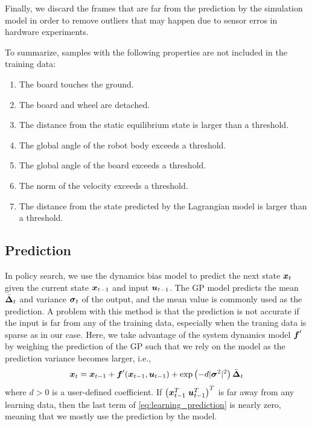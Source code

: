Finally, we discard the frames that are far from the prediction by the
simulation model in order to remove outliers that may happen due to
sensor erros in hardware experiments.

To summarize, samples with the following properties are not included in
the training data:
\begin{enumerate}
\item The board touches the ground.
\item The board and wheel are detached.
\item The distance from the static equilibrium state is larger than a
	  threshold.
\item The global angle of the robot body exceeds a threshold.
\item The global angle of the board exceeds a threshold.
\item The norm of the velocity exceeds a threshold.
\item The distance from the state predicted by the Lagrangian model is
	  larger than a threshold.
\end{enumerate}


\subsection{Prediction}

In policy search, we use the dynamics bias model to predict the next
state $\mbox{\boldmath \(x\)}_t$ given the current state $\mbox{\boldmath \(x\)}_{t-1}$ and input
$\mbox{\boldmath \(u\)}_{t-1}$.
The GP model predicts the mean
$\bar{\mbox{\boldmath \(\Delta\)}}_t$ and variance $\mbox{\boldmath \(\sigma\)}_t$ of the
output, and the mean value is commonly used as the prediction.
A problem with this method is that the prediction is not accurate if the
input is far from any of the training data, especially when the traning
data is sparse as in our case.
Here, we take advantage of the system dynamics model $\mbox{\boldmath \(f\)}'$ by
weighing the prediction of the GP such that we rely on the model as the
prediction variance becomes larger, i.e.,
\begin{equation}
\mbox{\boldmath \(x\)}_t = \mbox{\boldmath \(x\)}_{t-1} + \mbox{\boldmath \(f\)}'(\mbox{\boldmath \(x\)}_{t-1}, \mbox{\boldmath \(u\)}_{t-1}) +
 \exp\left( -d |\mbox{\boldmath \(\sigma\)}^2|^2\right) \bar{\mbox{\boldmath \(\Delta\)}}_t
\label{eq:learning_prediction}
\end{equation}
where $d>0$ is a user-defined coefficient.
If $\left(\mbox{\boldmath \(x\)}_{t-1}^T\;\mbox{\boldmath \(u\)}_{t-1}^T\right)^T$ is far away
from any learning data, then the last term of \eqref{eq:learning_prediction} is
nearly zero, meaning that we mostly use the prediction by the model.

